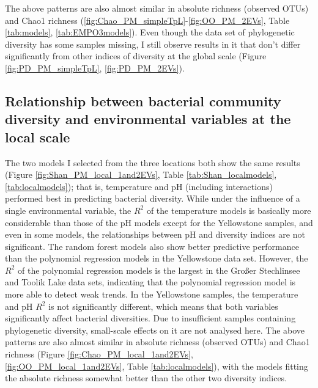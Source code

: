 \documentclass[11pt, a4paper]{article}
\newcommand{\multiref}[2]{\autoref{#1}-\ref{#2}} %
\begin{document}
\begin{spacing}{1.5}
The above patterns are also almost similar in absolute richness (observed OTUs) and Chao1 richness (\multiref{fig:Chao_PM_simpleTpL}{fig:OO_PM_2EVs}, Table \ref{tab:models}, \ref{tab:EMPO3models}). Even though the data set of phylogenetic diversity has some samples missing, I still observe results in it that don't differ significantly from other indices of diversity at the global scale (Figure \ref{fig:PD_PM_simpleTpL}, \ref{fig:PD_PM_2EVs}).

\subsection{Relationship between bacterial community diversity and environmental variables at the local scale}

The two models I selected from the three locations both show the same results (Figure \ref{fig:Shan_PM_local_1and2EVs}, Table \ref{tab:Shan_localmodels}, \ref{tab:localmodels}); that is, temperature and pH (including interactions) performed best in predicting bacterial diversity. While under the influence of a single environmental variable, the $R^{2}$ of the temperature models is basically more considerable than those of the pH models except for the Yellowstone samples, and even in some models, the relationships between pH and diversity indices are not significant. The random forest models also show better predictive performance than the polynomial regression models in the Yellowstone data set. However, the $R^{2}$ of the polynomial regression models is the largest in the Großer Stechlinsee and Toolik Lake data sets, indicating that the polynomial regression model is more able to detect weak trends. In the Yellowstone samples, the temperature and pH $R^{2}$ is not significantly different, which means that both variables significantly affect bacterial diversities. Due to insufficient samples containing phylogenetic diversity, small-scale effects on it are not analysed here. The above patterns are also almost similar in absolute richness (observed OTUs) and Chao1 richness (Figure \ref{fig:Chao_PM_local_1and2EVs}, \ref{fig:OO_PM_local_1and2EVs}, Table \ref{tab:localmodels}), with the models fitting the absolute richness somewhat better than the other two diversity indices.


\end{spacing}
\end{document}

